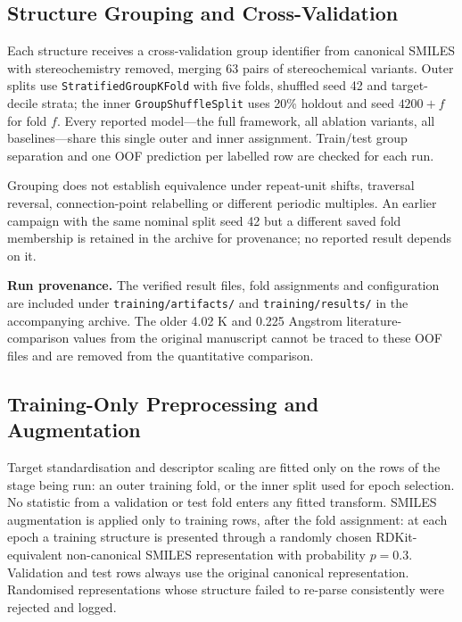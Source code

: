 \documentclass{article}
\begin{document}
\subsection{Structure Grouping and Cross-Validation}
\label{sec:cv}

Each structure receives a cross-validation group identifier from canonical SMILES with stereochemistry removed, merging 63 pairs of stereochemical variants. Outer splits use \texttt{StratifiedGroupKFold} with five folds, shuffled seed 42 and target-decile strata; the inner \texttt{GroupShuffleSplit} uses 20\% holdout and seed $4200+f$ for fold $f$. Every reported model---the full framework, all ablation variants, all baselines---share this single outer and inner assignment. Train/test group separation and one OOF prediction per labelled row are checked for each run.

Grouping does not establish equivalence under repeat-unit shifts, traversal reversal, connection-point relabelling or different periodic multiples. An earlier campaign with the same nominal split seed 42 but a different saved fold membership is retained in the archive for provenance; no reported result depends on it.

\textbf{Run provenance.} The verified result files, fold assignments and configuration are included under \texttt{training/artifacts/} and \texttt{training/results/} in the accompanying archive. The older 4.02 K and 0.225 Angstrom literature-comparison values from the original manuscript cannot be traced to these OOF files and are removed from the quantitative comparison.

\subsection{Training-Only Preprocessing and Augmentation}

Target standardisation and descriptor scaling are fitted only on the rows of the stage being run: an outer training fold, or the inner split used for epoch selection. No statistic from a validation or test fold enters any fitted transform. SMILES augmentation is applied only to training rows, after the fold assignment: at each epoch a training structure is presented through a randomly chosen RDKit-equivalent non-canonical SMILES representation with probability $p = 0.3$. Validation and test rows always use the original canonical representation. Randomised representations whose structure failed to re-parse consistently were rejected and logged.
\end{document}
